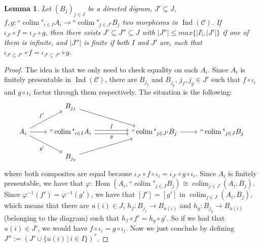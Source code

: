 \documentclass{article}
\newtheorem{Lemma}[theorem]{Lemma}
\newcommand{\fcolim}{\text{``}\colim\text{"}}
\newcommand{\Ind}{\operatorname{Ind}}
\renewcommand{\phi}{\varphi}
\newcommand{\Hom}{\operatorname{Hom}}
\newcommand{\colim}{\operatorname{colim}}
\begin{document}
\begin{Lemma}\label{eq_size}
    Let $(B_j)_{j\in J}$ be a directed digram, $J'\subseteq J$, $f,g:\fcolim_{i\in I}A_i\xrightarrow{}\fcolim_{j\in J'}B_j$ two morphisms in $\Ind(\mathcal{C})$. If $\iota_{J'}\circ f=\iota_{J'}\circ g$, then there exists $J'\subseteq J''\subseteq J$ with $|J''|\leq max\{|I|,|J'|\}$ if one of them is infinite, and $|J''|$ is finite if both $I$ and $J'$ are, such that $\iota_{J'\subseteq J''}\circ f=\iota_{J'\subseteq J''}\circ g$.
\end{Lemma}
\begin{proof}
    The idea is that we only need to check equality on each $A_i$. Since $A_i$ is finitely presentable in $\Ind(\mathcal{C})$, there are $B_{j_f}$ and $B_{j_g}$, $j_f,j_g\in J'$ such that $f\circ\iota_i$ and $g\circ\iota_i$ factor through them respectively. The situation is the following:
\[\begin{tikzcd}
	& {B_{j_f}} \\
	{A_i} & {\fcolim_{i\in I}A_i} && {\fcolim_{j\in J'}B_j} & {\fcolim_{j\in J}B_j} \\
	& {B_{j_g}}
	\arrow[from=1-2, to=2-4]
	\arrow["{f'}", from=2-1, to=1-2]
	\arrow[from=2-1, to=2-2]
	\arrow["{g'}"', from=2-1, to=3-2]
	\arrow["g"', shift right, from=2-2, to=2-4]
	\arrow["f", shift left, from=2-2, to=2-4]
	\arrow[from=2-4, to=2-5]
	\arrow[from=3-2, to=2-4]
\end{tikzcd}\]
where both composites are equal because $\iota_{J'}\circ f\circ \iota_i=\iota_{J'}\circ g\circ \iota_i$. Since $A_i$ is finitely presentable, we have that $\phi:\Hom(A_i,\fcolim_{j\in J}B_j)\cong\colim_{j\in J}(A_i,B_j)$. Since $\phi^{-1}(f')=\phi^{-1}(g')$, we have that $[f']=[g']$ in $\colim_{j\in J}(A_i,B_j)$, which means that there are $u(i)\in J$, $h_f:B_{j_f}\xrightarrow{}B_{u(i)}$ and $h_g:B_{j_g}\xrightarrow{}B_{u(i)}$ (belonging to the diagram) such that $h_f\circ f'=h_g\circ g'$. So if we had that $u(i)\in J'$, we would have $f\circ\iota_i=g\circ\iota_i$. Now we just conclude by defining $J'':=(J'\cup\{u(i)\,|\,i\in I\})^*$.
\end{proof}
\end{document}
